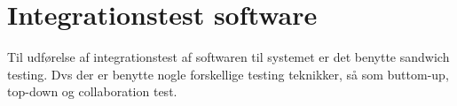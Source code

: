 \section{Integrationstest software}
Til udførelse af integrationstest af softwaren til systemet er det benytte sandwich testing. Dvs der er benytte nogle forskellige testing teknikker, så som buttom-up, top-down og collaboration test. 